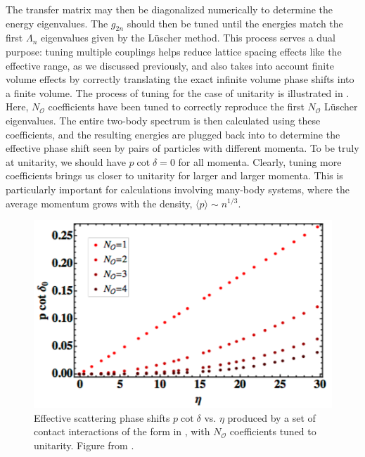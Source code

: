 The transfer matrix may then be diagonalized numerically to determine the energy eigenvalues. The $g_{2n}$ should then be tuned until the energies match the first $\Lambda_n$ eigenvalues given by the L\"uscher method. This process serves a dual purpose: tuning multiple couplings helps reduce lattice spacing effects like the effective range, as we discussed previously, and also takes into account finite volume effects by correctly translating the exact infinite volume phase shifts into a finite volume. The process of tuning for the case of unitarity is illustrated in . Here, $N_{{\mathcal{ O}}}$ coefficients have been tuned to correctly reproduce the first $N_{{\mathcal{ O}}}$ L\"uscher eigenvalues. The entire two-body spectrum is then calculated using these coefficients, and the resulting energies are plugged back into  to determine the effective phase shift seen by pairs of particles with different momenta. To be truly at unitarity, we should have $p\cot\delta = 0$ for all momenta. Clearly, tuning more coefficients brings us closer to unitarity for larger and larger momenta. This is particularly important for calculations involving many-body systems, where the average momentum grows with the density, $\langle p \rangle \sim n^{1/3}$.

\begin{figure}
\begin{center}
\includegraphics[width=0.5\linewidth]{Chapter5-figures/tuning.png}
\end{center}
\caption{\label{fig:tuning}Effective scattering phase shifts $p \cot \delta$ vs. $\eta$ produced by a set of contact interactions of the form in , with $N_{{\mathcal{ O}}}$ coefficients tuned to unitarity. Figure from \cite{EKLN1}.}
\end{figure}

